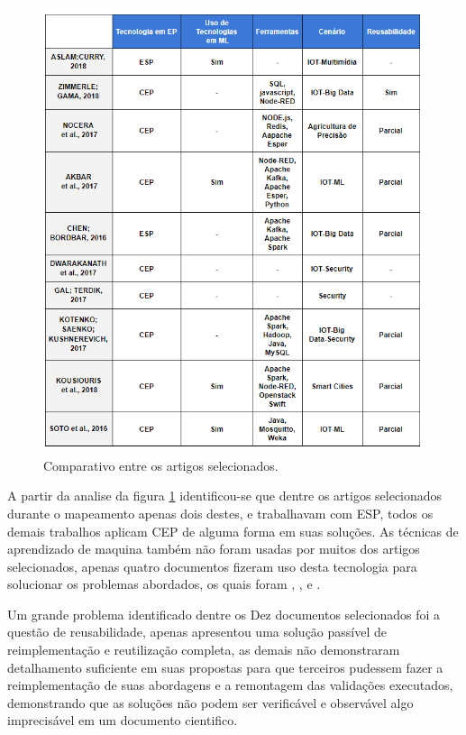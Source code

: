 \documentclass[tid,table]{texufpel} %
\begin{document}
\begin{figure}
	\centering
	\includegraphics[width=1\textwidth]{imagens/comparacaoArtigos.png}
	\caption{Comparativo entre os artigos selecionados.}
	\label{fig:comparacaoArtigos}
\end{figure}


A partir da analise da figura \ref{fig:comparacaoArtigos} identificou-se que dentre os artigos selecionados durante o mapeamento apenas dois destes, \cite{art1aslam2018towards} e \cite{art5chen2016dress} trabalhavam com ESP, todos os demais trabalhos aplicam CEP de alguma forma em suas soluções. As técnicas de aprendizado de maquina também não foram usadas por muitos dos artigos selecionados, apenas quatro documentos fizeram uso desta tecnologia para solucionar os problemas abordados, os quais foram \cite{art1aslam2018towards}, \cite{art4akbar2017predictive}, \cite{art9kousiouris2018integrated} e \cite{art10soto2016ceml}. 

Um grande problema identificado dentre os Dez documentos selecionados foi a questão de reusabilidade, apenas \cite{art2zimmerle2018web} apresentou uma solução passível de reimplementação e reutilização completa, as demais não demonstraram detalhamento suficiente em suas propostas para que terceiros pudessem  fazer a reimplementação de suas abordagens e a remontagem das validações executados, demonstrando que as soluções não podem ser verificável e observável algo imprecisável em um documento cientifico. 
\end{document}

